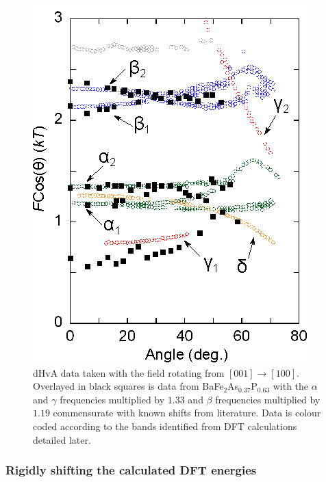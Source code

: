 {{{%
\begin{figure}
    \begin{center}
        \includegraphics[scale=0.9]{Chapter3-dHvABaFe2P2/Figures/AngleDepMeasurements/SubstitutionComparison/SubstitutionComparison}
        \caption{dHvA data taken with the field rotating from $[001]\rightarrow[100]$. Overlayed in black squares is data from BaFe$_2$As$_{0.37}$P$_{0.63}$\cite{Analytis2010c} with the $\alpha$ and $\gamma$ frequencies multiplied by $1.33$ and $\beta$ frequencies multiplied by $1.19$ commensurate with known shifts from literature. Data is colour coded according to the bands identified from DFT calculations detailed later.}
        \label{Fig:3:SubstitutionComparison}
    \end{center}
\end{figure}

\clearpage

\subsubsection{Rigidly shifting the calculated DFT energies}

}}}
